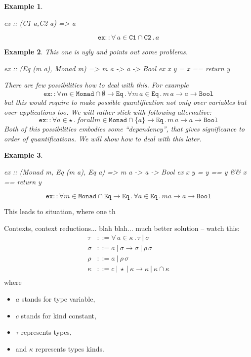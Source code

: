 \documentclass[11pt,oneside,draft]{fithesis2}
\newtheorem{example}{Example}
\begin{document}
\begin{example}~
\begin{code}
ex :: (C1 a,C2 a) => a
\end{code}
\[ \texttt{ex} :: \forall \, a \in \texttt{C1} \cap \texttt{C2} \, . \, a \]
\end{example}
 
\begin{example}
This one is ugly and points out some problems.
\begin{code}
ex :: (Eq (m a), Monad m) => m a -> a -> Bool
ex x y = x == return y
\end{code}
There are few possibilities how to deal with this. For example
\[ \texttt{ex} :: \forall m \in \texttt{Monad} \cap \emptyset \to \texttt{Eq} \, . \, \forall m \, a \in \texttt{Eq} \, . \, m \, a \to a \to \texttt{Bool} \]
but this would require to make possible quantification not only over variables but over applications too.
We will rather stick with following alternative:
\[ \texttt{ex} :: \forall a \in \star \, . \, forall m \in \texttt{Monad} \cap \{ a \} \to \texttt{Eq} \, . \, m \, a \to a \to \texttt{Bool} \]
Both of this possibilities embodies some ``dependency'', that gives significance to order of quantifications.
We will show how to deal with this later. %
\end{example}

\begin{example}~
\begin{code}
ex :: (Monad m, Eq (m a), Eq a) => m a -> a -> Bool
ex x y = y == y && x == return y
\end{code}
\[ \texttt{ex} :: \forall m \in \texttt{Monad} \cap \texttt{Eq} \to \texttt{Eq} \, . \, \forall a \in \texttt{Eq} \, . \, m a \to a \to \texttt{Bool} \]
\end{example}

This leads to situation, where one th

Contexts, context reductions... blah blah... much better solution -- watch this:
\begin{align*}
	\tau   & ::= \forall \, a \in \kappa \, . \, \tau ~|~ \sigma \\
	\sigma & ::= a ~|~ \sigma \to \sigma ~|~ \rho \, \sigma \\
	\rho   & ::= a ~|~ \rho \, \sigma \\
	\kappa & ::= c ~|~ \star ~|~ \kappa \to \kappa ~|~ \kappa \cap \kappa \\
\end{align*}
where
\begin{itemize}
	\item \(a\) stands for type variable,
	\item \(c\) stands for kind constant,
	\item \(\tau\) represents types,
	\item and \(\kappa\) represents types kinds.
\end{itemize}
\end{document}
